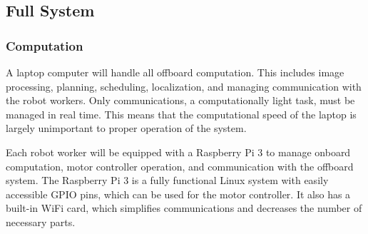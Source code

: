 
\subsection{Full System}
\label{sec:hardware_full_system}

\subsubsection{Computation}
\label{sec:computation}
A laptop computer will handle all offboard computation. This includes image processing, planning, scheduling, localization, and managing communication with the robot workers. Only communications, a computationally light task, must be managed in real time. This means that the computational speed of the laptop is largely unimportant to proper operation of the system. 

Each robot worker will be equipped with a Raspberry Pi 3 to manage onboard computation, motor controller operation, and communication with the offboard system. The Raspberry Pi 3 is a fully functional Linux system with easily accessible GPIO pins, which can be used for the motor controller. It also has a built-in WiFi card, which simplifies communications and decreases the number of necessary parts. 